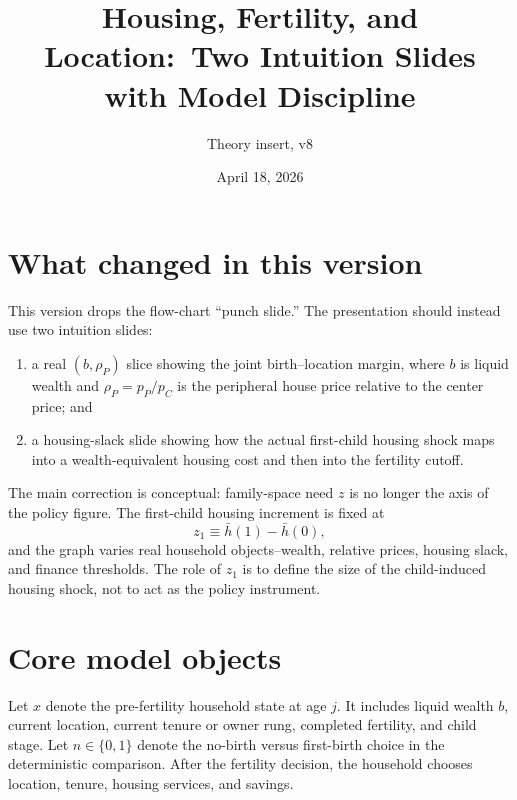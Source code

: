 \documentclass[11pt]{article}
\title{Housing, Fertility, and Location:\ Two Intuition Slides with Model Discipline}
\author{Theory insert, v8}
\date{April 18, 2026}
\newcommand{\rhoP}{\rho_P}
\theoremstyle{remark}
\begin{document}
\maketitle

\section*{What changed in this version}

This version drops the flow-chart ``punch slide.''  The presentation should instead use two intuition slides:
\begin{enumerate}[leftmargin=1.4em,itemsep=0.25em]
\item a real \((b,\rhoP)\) slice showing the joint birth--location margin, where \(b\) is liquid wealth and \(\rhoP=p_P/p_C\) is the peripheral house price relative to the center price; and
\item a housing-slack slide showing how the actual first-child housing shock maps into a wealth-equivalent housing cost and then into the fertility cutoff.
\end{enumerate}
The main correction is conceptual: family-space need \(z\) is no longer the axis of the policy figure.  The first-child housing increment is fixed at
\begin{equation}
  z_1 \equiv \bar h(1)-\bar h(0),
\end{equation}
and the graph varies real household objects--wealth, relative prices, housing slack, and finance thresholds.  The role of \(z_1\) is to define the size of the child-induced housing shock, not to act as the policy instrument.

\section{Core model objects}

Let \(x\) denote the pre-fertility household state at age \(j\).  It includes liquid wealth \(b\), current location, current tenure or owner rung, completed fertility, and child stage.  Let \(n\in\{0,1\}\) denote the no-birth versus first-birth choice in the deterministic comparison.  After the fertility decision, the household chooses location, tenure, housing services, and savings.
\end{document}
